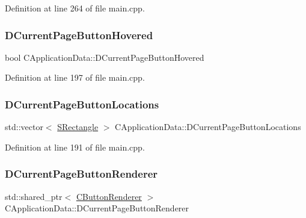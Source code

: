 Definition at line 264 of file main.\+cpp.

\hypertarget{classCApplicationData_a96b3a9b5c9965540007dff3fa85587fa}{}\label{classCApplicationData_a96b3a9b5c9965540007dff3fa85587fa} 
\subsubsection{\texorpdfstring{D\+Current\+Page\+Button\+Hovered}{DCurrentPageButtonHovered}}
{\footnotesize\ttfamily bool C\+Application\+Data\+::\+D\+Current\+Page\+Button\+Hovered\hspace{0.3cm}{\ttfamily [protected]}}



Definition at line 197 of file main.\+cpp.

\hypertarget{classCApplicationData_a3615df8e23cea3ce17f11cf61340a7b4}{}\label{classCApplicationData_a3615df8e23cea3ce17f11cf61340a7b4} 
\subsubsection{\texorpdfstring{D\+Current\+Page\+Button\+Locations}{DCurrentPageButtonLocations}}
{\footnotesize\ttfamily std\+::vector$<$ \hyperlink{structSRectangle}{S\+Rectangle} $>$ C\+Application\+Data\+::\+D\+Current\+Page\+Button\+Locations\hspace{0.3cm}{\ttfamily [protected]}}



Definition at line 191 of file main.\+cpp.

\hypertarget{classCApplicationData_abfe1743f2634b069ccc811db4a8733a8}{}\label{classCApplicationData_abfe1743f2634b069ccc811db4a8733a8} 
\subsubsection{\texorpdfstring{D\+Current\+Page\+Button\+Renderer}{DCurrentPageButtonRenderer}}
{\footnotesize\ttfamily std\+::shared\+\_\+ptr$<$ \hyperlink{classCButtonRenderer}{C\+Button\+Renderer} $>$ C\+Application\+Data\+::\+D\+Current\+Page\+Button\+Renderer\hspace{0.3cm}{\ttfamily [protected]}}



